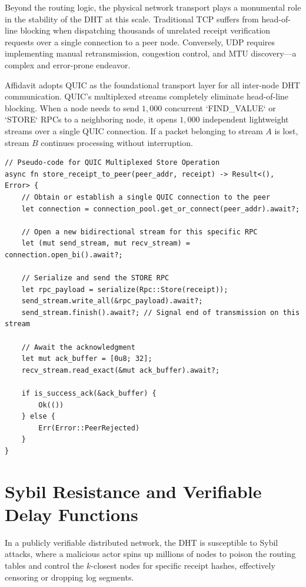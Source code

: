 Beyond the routing logic, the physical network transport plays a monumental role in the stability of the DHT at this scale. Traditional TCP suffers from head-of-line blocking when dispatching thousands of unrelated receipt verification requests over a single connection to a peer node. Conversely, UDP requires implementing manual retransmission, congestion control, and MTU discovery—a complex and error-prone endeavor.

Affidavit adopts QUIC as the foundational transport layer for all inter-node DHT communication. QUIC’s multiplexed streams completely eliminate head-of-line blocking. When a node needs to send $1,000$ concurrent `FIND_VALUE` or `STORE` RPCs to a neighboring node, it opens $1,000$ independent lightweight streams over a single QUIC connection. If a packet belonging to stream $A$ is lost, stream $B$ continues processing without interruption.

\begin{verbatim}
// Pseudo-code for QUIC Multiplexed Store Operation
async fn store_receipt_to_peer(peer_addr, receipt) -> Result<(), Error> {
    // Obtain or establish a single QUIC connection to the peer
    let connection = connection_pool.get_or_connect(peer_addr).await?;
    
    // Open a new bidirectional stream for this specific RPC
    let (mut send_stream, mut recv_stream) = connection.open_bi().await?;
    
    // Serialize and send the STORE RPC
    let rpc_payload = serialize(Rpc::Store(receipt));
    send_stream.write_all(&rpc_payload).await?;
    send_stream.finish().await?; // Signal end of transmission on this stream
    
    // Await the acknowledgment
    let mut ack_buffer = [0u8; 32];
    recv_stream.read_exact(&mut ack_buffer).await?;
    
    if is_success_ack(&ack_buffer) {
        Ok(())
    } else {
        Err(Error::PeerRejected)
    }
}
\end{verbatim}

\section{Sybil Resistance and Verifiable Delay Functions}

In a publicly verifiable distributed network, the DHT is susceptible to Sybil attacks, where a malicious actor spins up millions of nodes to poison the routing tables and control the $k$-closest nodes for specific receipt hashes, effectively censoring or dropping log segments.

